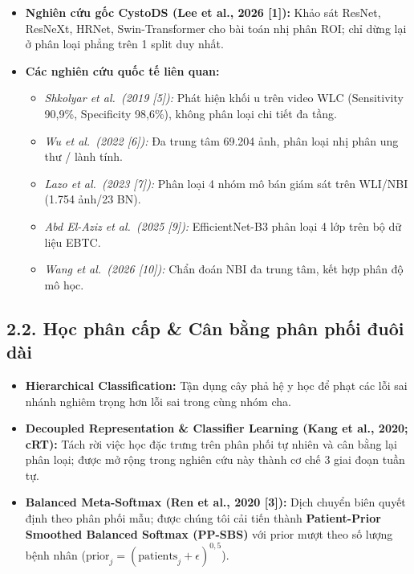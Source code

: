 \documentclass[
  10pt,
  a4paper,
  twocolumn]{article}
\providecommand{\tightlist}{%
  \setlength{\itemsep}{0pt}\setlength{\parskip}{0pt}}
\begin{document}
\begin{itemize}
\tightlist
\item
  \textbf{Nghiên cứu gốc CystoDS (Lee et al., 2026 {[}1{]}):} Khảo sát
  ResNet, ResNeXt, HRNet, Swin-Transformer cho bài toán nhị phân ROI;
  chỉ dừng lại ở phân loại phẳng trên 1 split duy nhất.
\item
  \textbf{Các nghiên cứu quốc tế liên quan:}

  \begin{itemize}
  \tightlist
  \item
    \emph{Shkolyar et al.~(2019 {[}5{]}):} Phát hiện khối u trên video
    WLC (Sensitivity 90,9\%, Specificity 98,6\%), không phân loại chi
    tiết đa tầng.
  \item
    \emph{Wu et al.~(2022 {[}6{]}):} Đa trung tâm 69.204 ảnh, phân loại
    nhị phân ung thư / lành tính.
  \item
    \emph{Lazo et al.~(2023 {[}7{]}):} Phân loại 4 nhóm mô bán giám sát
    trên WLI/NBI (1.754 ảnh/23 BN).
  \item
    \emph{Abd El-Aziz et al.~(2025 {[}9{]}):} EfficientNet-B3 phân loại
    4 lớp trên bộ dữ liệu EBTC.
  \item
    \emph{Wang et al.~(2026 {[}10{]}):} Chẩn đoán NBI đa trung tâm, kết
    hợp phân độ mô học.
  \end{itemize}
\end{itemize}

\subsection{2.2. Học phân cấp \& Cân bằng phân phối đuôi
dài}\label{hux1ecdc-phuxe2n-cux1ea5p-cuxe2n-bux1eb1ng-phuxe2n-phux1ed1i-ux111uuxf4i-duxe0i}

\begin{itemize}
\tightlist
\item
  \textbf{Hierarchical Classification:} Tận dụng cây phả hệ y học để
  phạt các lỗi sai nhánh nghiêm trọng hơn lỗi sai trong cùng nhóm cha.
\item
  \textbf{Decoupled Representation \& Classifier Learning (Kang et al.,
  2020; cRT):} Tách rời việc học đặc trưng trên phân phối tự nhiên và
  cân bằng lại phân loại; được mở rộng trong nghiên cứu này thành cơ chế
  3 giai đoạn tuần tự.
\item
  \textbf{Balanced Meta-Softmax (Ren et al., 2020 {[}3{]}):} Dịch chuyển
  biên quyết định theo phân phối mẫu; được chúng tôi cải tiến thành
  \textbf{Patient-Prior Smoothed Balanced Softmax (PP-SBS)} với prior
  mượt theo số lượng bệnh nhân
  (\(\text{prior}_j = (\text{patients}_j + \epsilon)^{0{,}5}\)).
\end{itemize}
\end{document}
